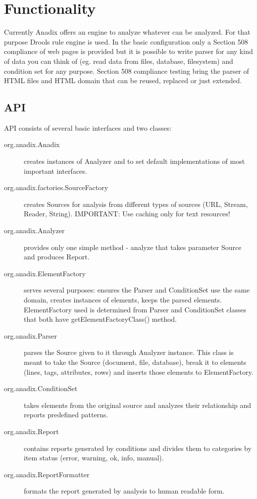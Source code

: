 \documentclass{report}
\begin{document}
\chapter{Functionality}
Currently Anadix offers an engine to analyze whatever can be analyzed. For that
purpose Drools rule engine is used. In the basic configuration only a Section
508 compliance of web pages is provided but it is possible to write parser for
any kind of data you can think of (eg. read data from files, database,
filesystem) and condition set for any purpose. Section 508 compliance testing
bring the parser of HTML files and HTML domain that can be reused, replaced or
just extended.

\section{API}
API consists of several basic interfaces and two classes:
\begin{description}
\item[org.anadix.Anadix] creates instances of Analyzer and to set default
implementations of most important interfaces.
\item[org.anadix.factories.SourceFactory] creates Sources for analysis from
different types of sources (URL, Stream, Reader, String). IMPORTANT: Use caching
only for text resources!
\item[org.anadix.Analyzer] provides only one simple method - analyze that takes
parameter Source and produces Report.
\item[org.anadix.ElementFactory] serves several purposes: ensures the Parser and
ConditionSet use the same domain, creates instances of elements, keeps the
parsed elements. ElementFactory used is determined from Parser and ConditionSet
classes that both have getElementFactoryClass() method.
\item[org.anadix.Parser] parses the Source given to it through Analyzer
instance. This class is meant to take the Source (document, file, database),
break it to elements (lines, tags, attributes, rows) and inserts those elements
to ElementFactory.
\item[org.anadix.ConditionSet] takes elements from the original source and
analyzes their relationship and reports predefined patterns.
\item[org.anadix.Report] contains reports generated by conditions and divides
them to categories by item status (error, warning, ok, info, manual).
\item[org.anadix.ReportFormatter] formats the report generated by analysis to
human readable form.
\end{description}
\end{document}
